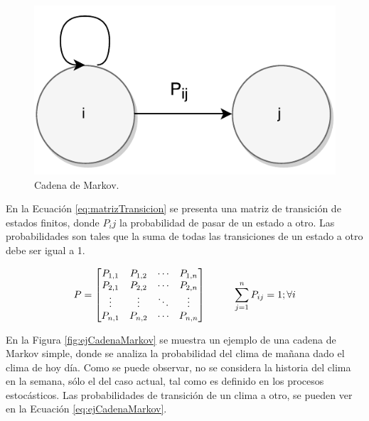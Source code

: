 \begin{figure}[ht!]
  \centering
    \includegraphics[scale=0.6]{images/CadenaMarkov.pdf}
  \caption{Cadena de Markov.}
  \label{fig:cadenaMarkov}
\end{figure}

En la Ecuaci\'on \ref{eq:matrizTransicion} se presenta una matriz de transici\'on de estados finitos, \normalsize{donde} $P_ij$ \normalsize{la probabilidad de pasar de un estado a otro. Las probabilidades son tales que la suma de todas las transiciones de un estado a otro debe ser igual a 1.}

\begin{equation} \label{eq:matrizTransicion}
	P =
	\begin{bmatrix}
		P_{1,1} & P_{1,2} & \cdots & P_{1,n} \\
		P_{2,1} & P_{2,2} & \cdots & P_{2,n} \\
		\vdots  & \vdots  & \ddots & \vdots  \\
		P_{n,1} & P_{n,2} & \cdots & P_{n,n} \\
	\end{bmatrix}
	\hspace*{1cm} \sum_{j=1}^{n} P_{ij} = 1 ; \forall i
\end{equation}

En la Figura \ref{fig:ejCadenaMarkov} se muestra un ejemplo de una cadena de Markov simple, donde se analiza la probabilidad del clima de ma\~nana dado el clima de hoy d\'ia. Como se puede observar, no se considera la historia del clima en la semana, s\'olo el del caso actual, tal como es definido en los procesos estoc\'asticos. Las probabilidades \normalsize{de transici\'on} de un clima a otro, se pueden ver en la Ecuaci\'on \ref{eq:ejCadenaMarkov}.

